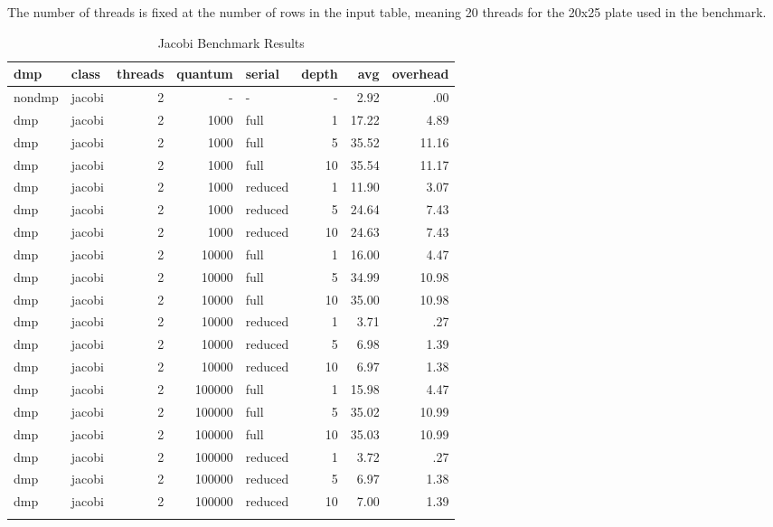 The number of threads is fixed at the number of rows in the input
table, meaning 20 threads for the 20x25 plate used in the benchmark.

\begin{center}
\begin{small}
\begin{longtable}{llrrlrrr}
\hline
dmp & class & threads & quantum & serial & depth & avg & overhead\\
\hline
nondmp & jacobi & 2 & - & - & - & 2.92 & .00\\
dmp & jacobi & 2 & 1000 & full & 1 & 17.22 & 4.89\\
dmp & jacobi & 2 & 1000 & full & 5 & 35.52 & 11.16\\
dmp & jacobi & 2 & 1000 & full & 10 & 35.54 & 11.17\\
dmp & jacobi & 2 & 1000 & reduced & 1 & 11.90 & 3.07\\
dmp & jacobi & 2 & 1000 & reduced & 5 & 24.64 & 7.43\\
dmp & jacobi & 2 & 1000 & reduced & 10 & 24.63 & 7.43\\
dmp & jacobi & 2 & 10000 & full & 1 & 16.00 & 4.47\\
dmp & jacobi & 2 & 10000 & full & 5 & 34.99 & 10.98\\
dmp & jacobi & 2 & 10000 & full & 10 & 35.00 & 10.98\\
dmp & jacobi & 2 & 10000 & reduced & 1 & 3.71 & .27\\
dmp & jacobi & 2 & 10000 & reduced & 5 & 6.98 & 1.39\\
dmp & jacobi & 2 & 10000 & reduced & 10 & 6.97 & 1.38\\
dmp & jacobi & 2 & 100000 & full & 1 & 15.98 & 4.47\\
dmp & jacobi & 2 & 100000 & full & 5 & 35.02 & 10.99\\
dmp & jacobi & 2 & 100000 & full & 10 & 35.03 & 10.99\\
dmp & jacobi & 2 & 100000 & reduced & 1 & 3.72 & .27\\
dmp & jacobi & 2 & 100000 & reduced & 5 & 6.97 & 1.38\\
dmp & jacobi & 2 & 100000 & reduced & 10 & 7.00 & 1.39\\
\hline
\caption{Jacobi Benchmark Results}
\label{tab:jacobi_results}
\end{longtable}
\end{small}
\end{center}

